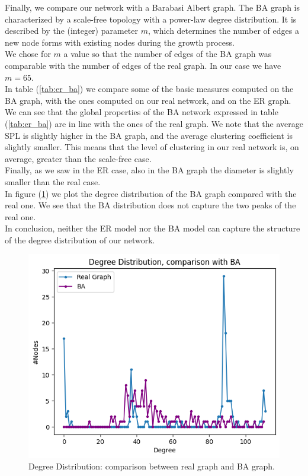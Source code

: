 Finally, we compare our network with a Barabasi Albert graph. The BA graph is characterized by a scale-free topology with a power-law degree distribution. It is described by the (integer) parameter $m$, which determines the number of edges a new node forms with existing nodes during the growth process.\\
We chose for $m$ a value so that the number of edges of the BA graph was comparable with the number of edges of the real graph. In our case we have $m = 65$.\\

In table (\ref{tab:er_ba}) we compare some of the basic measures computed on the BA graph, with the ones computed on our real network, and on the ER graph.\\

We can see that the global properties of the BA network expressed in table (\ref{tab:er_ba}) are in line with the ones of the real graph. We note that the average SPL is slightly higher in the BA graph, and the average clustering coefficient is slightly smaller. This means that the level of clustering in our real network is, on average, greater than the scale-free case.\\
Finally, as we saw in the ER case, also in the BA graph the diameter is slightly smaller than the real case.\\

In figure (\ref{fig:degree_ba}) we plot the degree distribution of the BA graph compared with the real one. We see that the BA distribution does not capture the two peaks of the real one.\\

In conclusion, neither the ER model nor the BA model can capture the structure of the degree distribution of our network.

\begin{figure}[h]
  \centering
  \includegraphics[width=\linewidth]{img/degree_dist_ba_xvii.png}
  \caption{Degree Distribution: comparison between real graph and BA graph.}
  \label{fig:degree_ba}
\end{figure}



